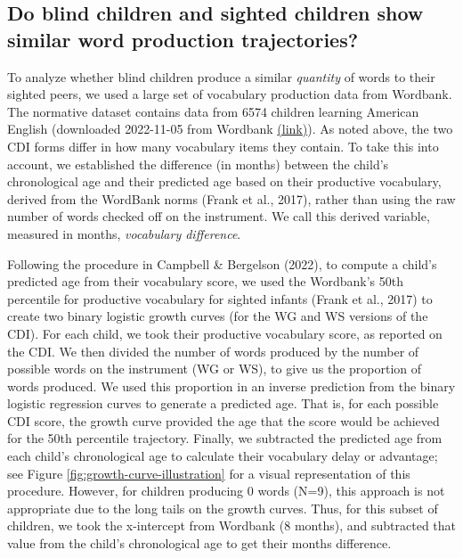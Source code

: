 \documentclass[
  man,floatsintext]{apa6}
\begin{document}
\hypertarget{do-blind-children-and-sighted-children-show-similar-word-production-trajectories}{%
\subsection{Do blind children and sighted children show similar word production trajectories?}\label{do-blind-children-and-sighted-children-show-similar-word-production-trajectories}}

To analyze whether blind children produce a similar \emph{quantity} of words to their sighted peers, we used a large set of vocabulary production data from Wordbank. The normative dataset contains data from 6574 children learning American English (downloaded 2022-11-05 from Wordbank \href{http://wordbank.stanford.edu/data?name=vocab_norms}{(link)}). As noted above, the two CDI forms differ in how many vocabulary items they contain. To take this into account, we established the difference (in months) between the child's chronological age and their predicted age based on their productive vocabulary, derived from the WordBank norms (Frank et al., 2017), rather than using the raw number of words checked off on the instrument. We call this derived variable, measured in months, \emph{vocabulary difference}.

Following the procedure in Campbell \& Bergelson (2022), to compute a child's predicted age from their vocabulary score, we used the Wordbank's 50th percentile for productive vocabulary for sighted infants (Frank et al., 2017) to create two binary logistic growth curves (for the WG and WS versions of the CDI). For each child, we took their productive vocabulary score, as reported on the CDI. We then divided the number of words produced by the number of possible words on the instrument (WG or WS), to give us the proportion of words produced. We used this proportion in an inverse prediction from the binary logistic regression curves to generate a predicted age. That is, for each possible CDI score, the growth curve provided the age that the score would be achieved for the 50th percentile trajectory. Finally, we subtracted the predicted age from each child's chronological age to calculate their vocabulary delay or advantage; see Figure \ref{fig:growth-curve-illustration} for a visual representation of this procedure. However, for children producing 0 words (N=9), this approach is not appropriate due to the long tails on the growth curves. Thus, for this subset of children, we took the x-intercept from Wordbank (8 months), and subtracted that value from the child's chronological age to get their months difference.
\end{document}
